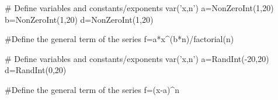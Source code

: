 


\begin{sagesilent}
# Define variables and constants/exponents
var('x,n')
a=NonZeroInt(1,20)
b=NonZeroInt(1,20)
d=NonZeroInt(1,20)

#Define the general term of the series
f=a*x^(b*n)/factorial(n)

\end{sagesilent}


\begin{sagesilent}
# Define variables and constants/exponents
var('x,n')
a=RandInt(-20,20)
d=RandInt(0,20)

#Define the general term of the series
f=(x-a)^n

\end{sagesilent}

